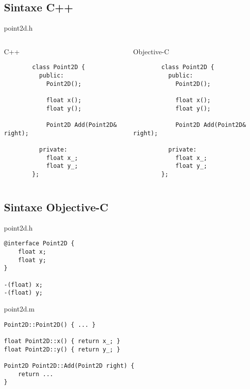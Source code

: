 \documentclass[brazil]{beamer}
\begin{document}
\subsection{Sintaxe C++}

\begin{frame}[fragile]
  point2d.h
  \begin{columns}
    \begin{column}{.5\textwidth}
      \begin{center}
        C++
      \end{center}
      \lstset{language=C++,basicstyle=\tiny}
      \begin{lstlisting}
        class Point2D {
          public:
            Point2D();

            float x();
            float y();

            Point2D Add(Point2D& right);

          private:
            float x_;
            float y_;
        };
      \end{lstlisting}
    \end{column}
    \begin{column}{.5\textwidth}
      \begin{center}
        Objective-C
      \end{center}
      \lstset{language=C++,basicstyle=\tiny}
      \begin{lstlisting}
        class Point2D {
          public:
            Point2D();

            float x();
            float y();

            Point2D Add(Point2D& right);

          private:
            float x_;
            float y_;
        };
      \end{lstlisting}
    \end{column}
  \end{columns}
\end{frame}



\subsection{Sintaxe Objective-C}
point2d.h
\lstset{language=Objective-C,basicstyle=\footnotesize}
\begin{lstlisting}
@interface Point2D {
    float x;
    float y;
}

-(float) x;
-(float) y;
\end{lstlisting}

point2d.m
\lstset{language=Objective-C,basicstyle=\footnotesize}
\begin{lstlisting}
Point2D::Point2D() { ... }

float Point2D::x() { return x_; }
float Point2D::y() { return y_; }

Point2D Point2D::Add(Point2D right) {
    return ...
}
\end{lstlisting}
\end{document}
